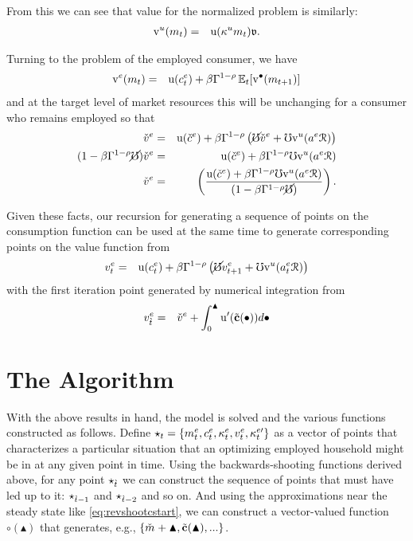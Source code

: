 \message{ !name(TractableBufferStock.tex)}\documentclass{handout}
\begin{document}
From this we can see that value for the normalized problem is similarly:
\begin{eqnarray}
  \mathrm{v}^{u}(m_{t}) & = & {\mathrm{u}}(\kappa^{u} m_{t}) \mathfrak{v}
.
\end{eqnarray}

Turning to the problem of the employed consumer, we have
\begin{eqnarray}
  \mathrm{v}^{e}(m_{t}) & = & {\mathrm{u}}(c^{e}_{t})+\beta \Gamma^{1-\rho} \operatorname{\mathbb{E}}_{t}[\mathrm{v}^{\bullet}(m_{t+1})]
\end{eqnarray}
and at the target level of market resources this will be unchanging for a consumer who
remains employed so that 
\begin{eqnarray}
  \check{v}^{e} & = & {\mathrm{u}}(\check{c}^{e})+\beta \Gamma^{1-\rho} \left(\cancel{\mho} \check{v}^{e} + \mho \mathrm{v}^{u}(a^{e} \mathcal{R})\right)
\\ (1-\beta \Gamma^{1-\rho} \cancel{\mho}) \check{v}^{e} & = & {\mathrm{u}}(\check{c}^{e})+\beta \Gamma^{1-\rho} \mho \mathrm{v}^{u}(a^{e} \mathcal{R})
\\ \check{v}^{e} & = & \left(\frac{{\mathrm{u}}(\check{c}^{e})+\beta \Gamma^{1-\rho} \mho \mathrm{v}^{u}(a^{e} \mathcal{R})}{(1-\beta \Gamma^{1-\rho} \cancel{\mho}) }\right)
.
\end{eqnarray}

Given these facts, our recursion for generating a sequence of points on the consumption
function can be used at the same time to generate corresponding points on the value function from
\begin{eqnarray}
  {v}^{e}_{t} & = & {\mathrm{u}}(c^{e}_{t})+\beta \Gamma^{1-\rho} \left(\cancel{\mho} {v}^{e}_{t+1} + \mho \mathrm{v}^{u}(a^{e}_{t} \mathcal{R})\right)
\end{eqnarray}
with the first iteration point generated by numerical integration from 
\begin{eqnarray}
  v^{e}_{\grave{t}} & = & \check{v}^{e}+\int_{0}^{\blacktriangle} {\mathrm{u}^{\prime}}(\tilde{\mathbf{c}}(\bullet)) d\bullet
\end{eqnarray}



\section{The Algorithm}

With the above results in hand, the model is solved and the various
functions constructed as follows.  Define $\star_{t} =
\{m^{e}_{t},c^{e}_{t},\kappa^{e}_{t},{v}^{e}_{t},\kappa_{t}^{e\prime}\}$ as a vector of points that
characterizes a particular situation that an optimizing employed
household might be in at any given point in time.  Using the backwards-shooting 
functions derived above, for any point $\star_{\grave{t}}$ we can construct the
sequence of points that must have led up to it: $\star_{\grave{t}-1}$ and
$\star_{\grave{t}-2}$ and so on.  And using the approximations near the
steady state like \eqref{eq:revshootcstart}, we can construct 
a vector-valued function $\pmb{\circ}(\blacktriangle)$ that generates, 
e.g., $\{\mTarg^{\null}+\blacktriangle,\tilde{\mathbf{c}}(\blacktriangle), ... \}$.
\end{document}
